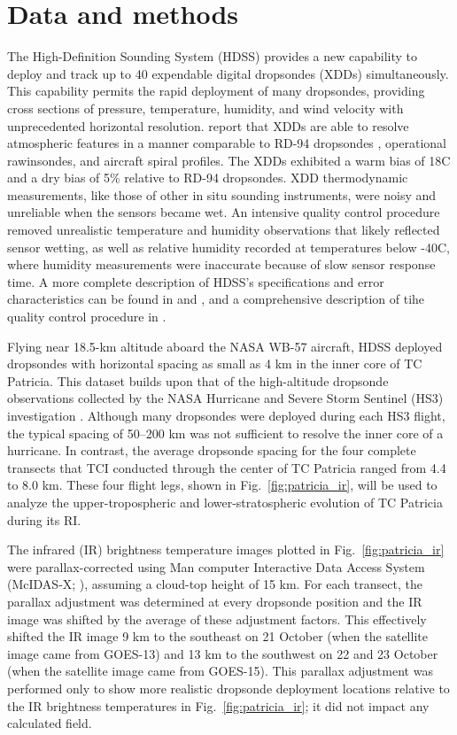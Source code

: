 \section{Data and methods}
The High-Definition Sounding System (HDSS) provides a new capability to deploy and track up to 40 expendable digital dropsondes (XDDs) simultaneously.
This capability permits the rapid deployment of many dropsondes, providing cross sections of pressure, temperature, humidity, and wind velocity with unprecedented horizontal resolution.
\cite{Blacketal2017} report that XDDs are able to resolve atmospheric features in a manner comparable to RD-94 dropsondes \cite{HockFranklin1999}, operational rawinsondes, and aircraft spiral profiles.
The XDDs exhibited a warm bias of 18C and a dry bias of 5\% relative to RD-94 dropsondes.
XDD thermodynamic measurements, like those of other in situ sounding instruments, were noisy and unreliable when the sensors became wet.
An intensive quality control procedure \cite{BellTCI} removed unrealistic temperature and humidity observations that likely reflected sensor wetting, as well as relative humidity recorded at temperatures below -40\textdegree{}C, where humidity measurements were inaccurate because of slow sensor response time.
A more complete description of HDSS’s specifications and error characteristics can be found in \cite{Blacketal2017} and \cite{DoyleTCI}, and a comprehensive description of tihe quality control procedure in \cite{BellTCI}.

Flying near 18.5-km altitude aboard the NASA WB-57 aircraft, HDSS deployed dropsondes with horizontal spacing as small as 4 km in the inner core of TC Patricia.
This dataset builds upon that of the high-altitude dropsonde observations collected by the NASA Hurricane and Severe Storm Sentinel (HS3) investigation \cite{Braunetal2016}.
Although many dropsondes were deployed during each HS3 flight, the typical spacing of 50–200 km was not sufficient to resolve the inner core of a hurricane. In contrast, the average dropsonde spacing for the four complete transects that TCI conducted through the center of TC Patricia ranged from 4.4 to 8.0 km. 
These four flight legs, shown in Fig.~\ref{fig:patricia_ir}, will be used to analyze the upper-tropospheric and lower-stratospheric evolution of TC Patricia during its RI.

The infrared (IR) brightness temperature images plotted in Fig.~\ref{fig:patricia_ir} were parallax-corrected using Man
computer Interactive Data Access System (McIDAS-X; \citeauthor{Lazzaraetal1999} \citeyear{Lazzaraetal1999}), assuming a cloud-top height of 15 km.
For each transect, the parallax adjustment was determined at every dropsonde position and the IR image was shifted by the average of these adjustment factors.
This effectively shifted the IR image 9 km to the southeast on 21 October (when the satellite image came from GOES-13) and 13 km to the southwest on 22 and 23 October (when the satellite image came from GOES-15).
This parallax adjustment was performed only to show more realistic dropsonde deployment locations relative to the IR brightness temperatures in Fig.~\ref{fig:patricia_ir}; it did not impact any calculated field.

